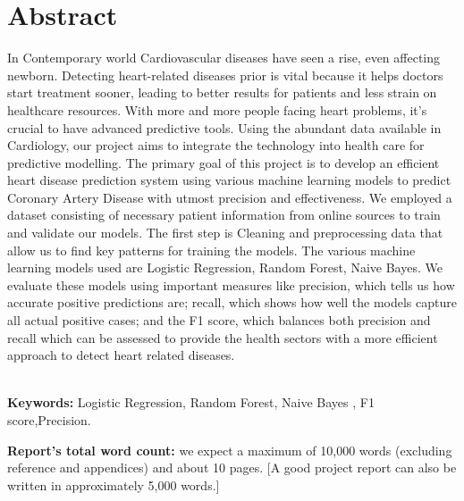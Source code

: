 \chapter*{\center \Large  Abstract}
In Contemporary world Cardiovascular diseases have seen a rise, even affecting newborn. Detecting heart-related diseases prior is vital because it helps doctors start treatment sooner, leading to better results for patients and less strain on healthcare resources. With more and more people facing heart problems, it's crucial to have advanced predictive tools. Using the abundant data available in Cardiology, our project aims to integrate the technology into health care for predictive modelling. The primary goal of this project is to develop an efficient heart disease prediction system using various machine learning models to predict Coronary Artery Disease with utmost precision and effectiveness. We employed a dataset consisting of necessary patient information from online sources to train and validate our models. The first step is Cleaning and preprocessing data that allow us to find key patterns for training the models. The various machine learning models used are Logistic Regression, Random Forest, Naive Bayes. We evaluate these models using important measures like precision, which tells us how accurate positive predictions are; recall, which shows how well the models capture all actual positive cases; and the F1 score, which balances both precision and recall which can be assessed to provide the health sectors with a more efficient approach to detect heart related diseases.



~\\[1cm]
\noindent %
\textbf{Keywords:} Logistic Regression, Random Forest, Naive Bayes , F1 score,Precision.


\vfill
\noindent
\textbf{Report's total word count:} we expect a maximum of 10,000 words (excluding reference and appendices) and about 10 pages. [A good project report can also be written in approximately 5,000 words.]

